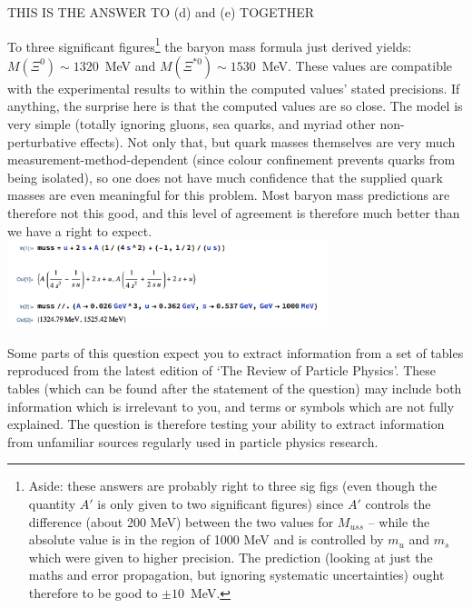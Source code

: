 \documentclass[txfonts]{NSTexam}
\begin{document}
\begin{questions}
\begin{allparts}
{THIS IS THE ANSWER TO (d) and (e) TOGETHER

To three significant figures\footnote{Aside: these answers are probably right to three sig figs (even though the quantity $A'$ is only given to two significant figures) since $A'$ controls the difference (about 200 MeV) between the two values for $M_{uss}$ -- while the absolute value is in the region of 1000 MeV and is controlled by $m_u$ and $m_s$ which were given to higher precision. The prediction (looking at just the maths and error propagation, but ignoring systematic uncertainties) ought therefore to be good to $\pm10$~MeV.} the baryon mass formula just derived yields:  $M(\Xi^0)\sim 1320$~MeV and $M(\Xi^{*0})\sim 1530$~MeV.  These  values are compatible with the experimental results to within the computed values' stated precisions. If anything, the surprise here is that the computed values are so close.  The model is very simple (totally ignoring gluons, sea quarks, and  myriad other non-perturbative effects).  Not only that, but quark masses themselves are very much measurement-method-dependent (since colour confinement prevents quarks from being isolated), so one does not have much confidence that the supplied quark masses are even meaningful for this problem. Most baryon mass predictions are therefore not this good, and this level of agreement is therefore much better than we have a right to expect.
\includegraphics[width=0.7\textwidth]{Images/baryon_mass_calc.png}

}

\end{allparts}



\clearpage
\question

\noindent 
\startpart

\noindent
Some parts of this question expect you to extract information from a  set of tables reproduced from the latest edition of `The Review of Particle Physics'.
These tables (which can be found after the statement of the question) may include both information which is irrelevant to you, and terms or symbols which are not fully explained. The question is therefore testing your ability to extract information from unfamiliar  sources regularly used in particle physics research.
\begin{allparts}

\end{allparts}
\end{questions}
\end{document}
